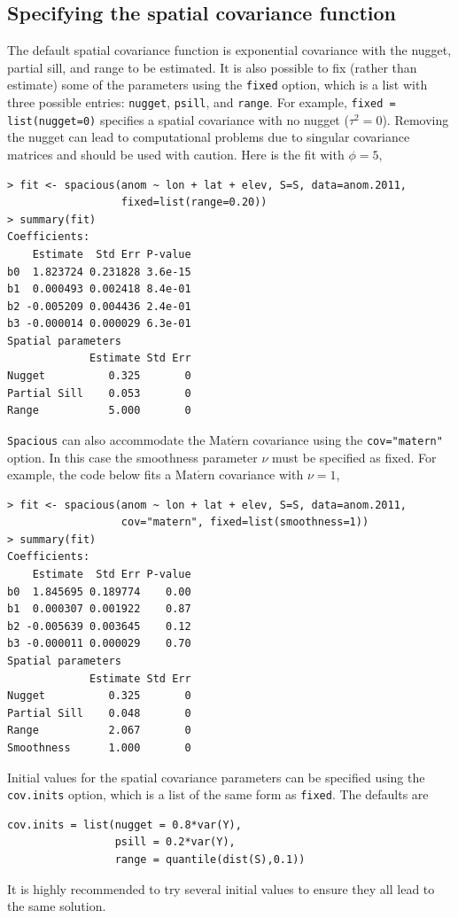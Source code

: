 \documentclass[11pt]{article}
\newcommand{\Matern}{ \mbox{Mat$\acute{\mbox{e}}$rn}}
\begin{document}
\subsection{Specifying the spatial covariance function}
The default spatial covariance function is exponential covariance with the nugget, partial sill, and range to be estimated.
It is also possible to fix (rather than estimate) some of the parameters using the {\tt fixed} option, which is a list with three possible entries: {\tt nugget}, {\tt psill}, and {\tt range}.
For example, {\tt fixed = list(nugget=0)} specifies a spatial covariance with no nugget ($\tau^2=0$).
Removing the nugget can lead to computational problems due to singular covariance matrices and should be used with caution.
Here is the fit with $\phi=5$,

\begin{verbatim}
> fit <- spacious(anom ~ lon + lat + elev, S=S, data=anom.2011,
                  fixed=list(range=0.20))
> summary(fit)
Coefficients:
    Estimate  Std Err P-value
b0  1.823724 0.231828 3.6e-15
b1  0.000493 0.002418 8.4e-01
b2 -0.005209 0.004436 2.4e-01
b3 -0.000014 0.000029 6.3e-01
Spatial parameters
             Estimate Std Err
Nugget          0.325       0
Partial Sill    0.053       0
Range           5.000       0
\end{verbatim}

{\tt Spacious} can also accommodate the $\Matern$ covariance using the {\tt cov="matern"} option.
In this case the smoothness parameter $\nu$ must be specified as fixed.
For example, the code below fits a $\Matern$ covariance with $\nu=1$,

\begin{verbatim}
> fit <- spacious(anom ~ lon + lat + elev, S=S, data=anom.2011,
                  cov="matern", fixed=list(smoothness=1))
> summary(fit)
Coefficients:
    Estimate  Std Err P-value
b0  1.845695 0.189774    0.00
b1  0.000307 0.001922    0.87
b2 -0.005639 0.003645    0.12
b3 -0.000011 0.000029    0.70
Spatial parameters
             Estimate Std Err
Nugget          0.325       0
Partial Sill    0.048       0
Range           2.067       0
Smoothness      1.000       0
\end{verbatim}

Initial values for the spatial covariance parameters can be specified using the {\tt cov.inits} option, which is a list of the same form as {\tt fixed}.   The defaults are
\begin{verbatim}
cov.inits = list(nugget = 0.8*var(Y),
                 psill = 0.2*var(Y),
                 range = quantile(dist(S),0.1))
\end{verbatim}
It is highly recommended to try several initial values to ensure they all lead to the same solution.
\end{document}
